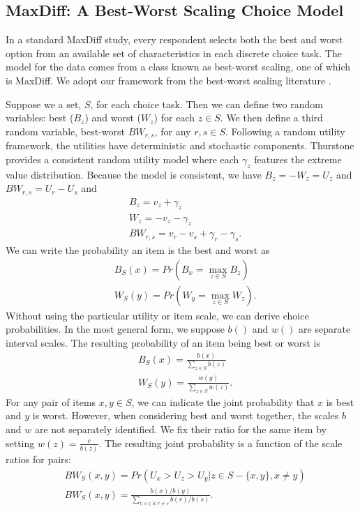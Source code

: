 \documentclass[nonblindrev]{informs3}
\begin{document}
\subsection{MaxDiff: A Best-Worst Scaling Choice Model}

In a standard MaxDiff study, every respondent selects both the best and worst option from an available set of characteristics in each discrete choice task. The model for the data comes from a class known as best-worst scaling, one of which is MaxDiff. We adopt our framework from the best-worst scaling literature \citep{marley2005some,marley2012models}. 

Suppose we a set, $S$, for each choice task. Then we can define two random variables: best ($B_z$) and worst ($W_z$) for each $z \in S$.  We then define a third random variable, best-worst $BW_{r,s}$, for any $r,s \in S$. Following a random utility framework, the utilities have deterministic and stochastic components. Thurstone provides a consistent random utility model where each $\gamma_z$ features the extreme value distribution. Because the model is consistent, we have $B_z=-W_z=U_z$ and $BW_{r,s}=U_r-U_s$ and
\begin{align*}
&B_z=v_z+\gamma_z\\
&W_z=-v_z-\gamma_z\\
&BW_{r,s}=v_r-v_s+\gamma_r-\gamma_s.
\end{align*}We can write the probability an item is the best and worst as
\begin{align*}
&B_S (x)= Pr⁡( B_x=\max_{z \in S} B_z)\\
&W_S (y)= Pr⁡( W_y=\max_{z \in S} W_z).
\end{align*}
Without using the particular utility or item scale, we can derive choice probabilities. In the most general form, we suppose $b()$ and $w()$ are separate interval scales. The resulting probability of an item being best or worst is
\begin{align*}
&B_S (x)= \frac{b(x)}{\sum_{z \in S}b(z)}\\
&W_S (y)= \frac{w(y)}{\sum_{z \in S}w(z)}.
\end{align*}
For any pair of items $x,y \in S$, we can indicate the joint probability that $x$ is best and $y$ is worst. However, when considering best and worst together, the scales $b$ and $w$ are not separately identified. We fix their ratio for the same item by setting $w(z)=\frac{c}{b(z)}$. The resulting joint probability is a function of the scale ratios for pairs: 
\begin{align*}
&BW_S(x,y)=Pr(U_x>U_z>U_y | z \in S -\{x,y\}, x\neq y)\\
&BW_S(x,y)=\frac{b(x)/b(y)}{\sum_{r,s \in S, r \neq s}b(r)/b(s)}.
\end{align*}
\end{document}
